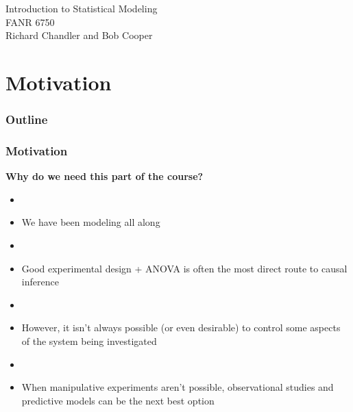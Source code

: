\documentclass[color=usenames,dvipsnames]{beamer}\usepackage[]{graphicx}\usepackage[]{color}
\begin{document}



\begin{frame}[plain]
  \huge
  \centering \par
  \textcolor{NavyBlue}{Introduction to Statistical Modeling} \\
  \vspace{1cm}
  \Large
  FANR 6750 \\
  \vfill
  \large
  Richard Chandler and Bob Cooper
\end{frame}


\section{Motivation}



\begin{frame}
  \frametitle{Outline}
  \LARGE
\end{frame}




\begin{frame}
  \frametitle{Motivation}
  \large
  {\bf Why do we need this part of the course? \par}
  \pause
  \begin{itemize}%
    \item[]
    \item<2-> We have been modeling all along
    \item[]
    \item<3-> Good experimental design + ANOVA is often the most direct
      route to causal inference
    \item[]
    \item<4-> However, it isn't always possible (or even desirable) to
      control some aspects of the system being investigated
    \item[]
    \item<5-> When manipulative experiments aren't 
      possible, observational studies
      and predictive models can be the next best option
  \end{itemize}
\end{frame}
\end{document}
